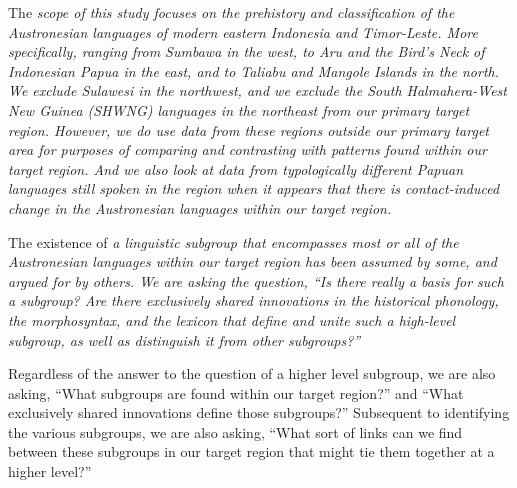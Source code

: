 The \it{scope} of this study focuses on the prehistory and classification
of the Austronesian languages of modern eastern Indonesia and Timor-Leste.
More specifically, ranging from Sumbawa in the west,
to Aru and the Bird’s Neck of Indonesian Papua in the east,
and to Taliabu and Mangole Islands in the north.
We exclude Sulawesi in the northwest,
and we exclude the South Halmahera-West New Guinea (SHWNG) languages
in the northeast from our primary target region.
However, we do use data from these regions outside our primary
target area for purposes of comparing and contrasting with patterns found within our target region.
And we also look at data from typologically different Papuan languages
still spoken in the region when it appears that there is contact-induced change
in the Austronesian languages within our target region.

The existence of \it{a linguistic subgroup} that encompasses most or
all of the Austronesian languages within our target region has been assumed by some,
and argued for by others.
We are asking the question, “Is there really a basis for such a subgroup?
Are there exclusively shared innovations in the historical phonology,
the morphosyntax, and the lexicon that define and unite such a high-level subgroup,
as well as distinguish it from other subgroups?”

Regardless of the answer to the question of a higher level subgroup,
we are also asking, “What subgroups are found within our target region?”
and “What exclusively shared innovations define those subgroups?”
Subsequent to identifying the various subgroups, we are also asking,
“What sort of links can we find between these subgroups
in our target region that might tie them together at a higher level?”